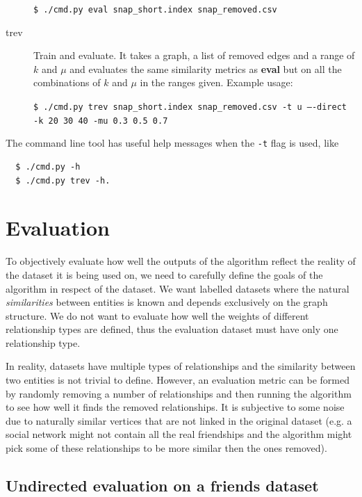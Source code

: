\documentclass[12pt]{report}
\begin{document}
\begin{description}
  {\tt \$ ./cmd.py eval snap\_short.index snap\_removed.csv}
  \item[trev] Train and evaluate. It takes a graph, a list of removed edges and
    a range of $k$ and $\mu$ and evaluates the same similarity metrics as
    \textbf{eval} but on all the combinations of $k$ and $\mu$ in the ranges given.
    Example usage:

    {\tt \$ ./cmd.py trev snap\_short.index snap\_removed.csv -t u ----direct -k 20 30 40 -mu 0.3 0.5 0.7 }
\end{description}

The command line tool has useful help messages when the {\tt -t} flag is used, like
\begin{lstlisting}
  $ ./cmd.py -h
  $ ./cmd.py trev -h.
\end{lstlisting}

%
%
\section{Evaluation}

To objectively evaluate how well the outputs of the algorithm reflect the reality
of the dataset it is being used on, we need to carefully define the goals of the
algorithm in respect of the dataset. We want labelled datasets where the natural
\textit{similarities} between entities is known and depends exclusively on the
graph structure. We do not want to evaluate how well the weights of different
relationship types are defined, thus the evaluation dataset must have only one
relationship type.

In reality, datasets have multiple types of relationships and the similarity
between two entities is not trivial to define. However, an evaluation metric can
be formed by randomly removing a number of relationships and then running the
algorithm to see how well it finds the removed relationships. It is subjective
to some noise due to naturally similar vertices that are not linked in the
original dataset (e.g. a social network might not contain all the real
friendships and the algorithm might pick some of these relationships to be more
similar then the ones removed).


\subsection{Undirected evaluation on a friends dataset}
\end{document}
